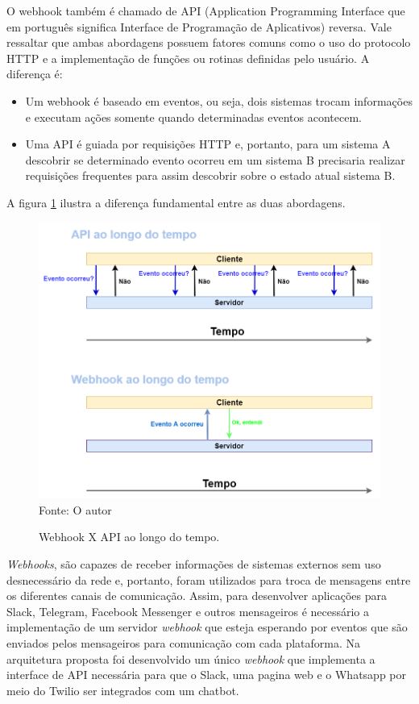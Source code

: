 O webhook também é chamado de API (Application Programming Interface que em português significa Interface de Programação de Aplicativos) reversa. Vale ressaltar que ambas abordagens possuem fatores comuns como o uso do protocolo HTTP e a implementação de funções ou rotinas definidas pelo usuário. A diferença é:

    \begin{itemize}
        \item Um webhook é baseado em eventos, ou seja, dois sistemas trocam informações e executam ações somente quando determinadas eventos acontecem.
        \item Uma API é guiada por requisições HTTP e, portanto, para um sistema A descobrir se determinado evento ocorreu em um sistema B precisaria realizar requisições frequentes para assim descobrir sobre o estado atual sistema B.  
    \end{itemize}

A figura \ref{fig:webhookdiff} ilustra a diferença fundamental entre as duas abordagens.

\begin{figure}[H]
  \centering
  \caption{Webhook X API ao longo do tempo.}
  \centering
  \includegraphics[scale=0.5]{Imagens/webhook-api.png} 
  \label{fig:webhookdiff}
  Fonte: O autor
\end{figure}



\textit{Webhooks}, são capazes de receber informações de sistemas externos sem uso desnecessário da rede e, portanto, foram utilizados para troca de mensagens entre os diferentes canais de comunicação. Assim, para desenvolver aplicações para Slack, Telegram,  Facebook Messenger e outros mensageiros é necessário a implementação de um servidor\textit{ webhook} que esteja esperando por eventos que são enviados pelos mensageiros para comunicação com cada plataforma. Na arquitetura proposta foi desenvolvido um único\textit{ webhook} que implementa a interface de API necessária para que o Slack, uma pagina web e o Whatsapp por meio do Twilio ser integrados com um chatbot.

